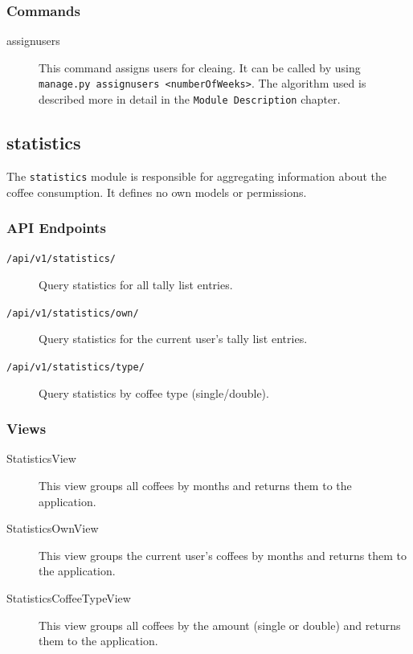 \subsubsection{Commands}\label{commands}

\begin{description}
\item[assignusers] This command assigns users for cleaing. It can be
called by using
\texttt{manage.py\ assignusers\ \textless{}numberOfWeeks\textgreater{}}.
The algorithm used is described more in detail in the
\texttt{Module\ Description} chapter.
\end{description}

\subsection{statistics}\label{statistics-1}

The \texttt{statistics} module is responsible for aggregating
information about the coffee consumption. It defines no own models or
permissions.

\subsubsection{API Endpoints}\label{api-endpoints-2}

\begin{description}
\item[\texttt{/api/v1/statistics/}] Query statistics for all tally list
entries.

\item[\texttt{/api/v1/statistics/own/}] Query statistics for the current user's
tally list entries.

\item[\texttt{/api/v1/statistics/type/}] Query statistics by coffee type
(single/double).
\end{description}

\subsubsection{Views}\label{views-4}

\begin{description}
\item[StatisticsView] This view groups all coffees by months and
returns them to the application.

\item[StatisticsOwnView] This view groups the current user's coffees
by months and returns them to the application.

\item[StatisticsCoffeeTypeView] This view groups all coffees by the
amount (single or double) and returns them to the application.
\end{description}


